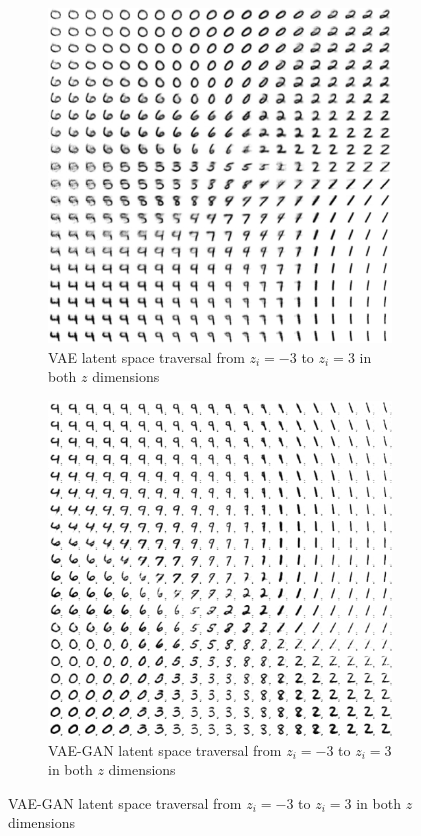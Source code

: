\begin{figure}
    \centering
    \begin{subfigure}{.45\textwidth}
        \centering
        \includegraphics[width=\textwidth]{images/latent_space_traversals/vae_mnist.png}
        \caption{\ac{VAE} latent space traversal from $z_i=-3$ to $z_i=3$ in both $z$ dimensions}
    \end{subfigure}
    \hfill
    \begin{subfigure}{.45\textwidth}
        \centering
        \includegraphics[width=\textwidth]{images/latent_space_traversals/vae_gan_mnist.png}
        \caption{\ac{VAE}-\ac{GAN} latent space traversal from $z_i=-3$ to $z_i=3$ in both $z$ dimensions}
    \end{subfigure}
\end{figure}
